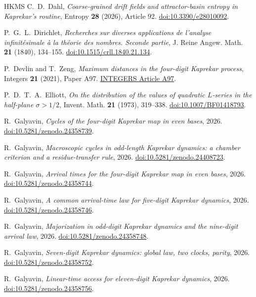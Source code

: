 \documentclass[11pt,reqno]{amsart}
\begin{document}
\begin{thebibliography}{HKMS}
C.~D.~Dahl, \emph{Coarse-grained drift fields and attractor-basin entropy
in Kaprekar's routine}, Entropy \textbf{28} (2026), Article 92.
\href{https://doi.org/10.3390/e28010092}{doi:10.3390/e28010092}.

P.~G.~L.~Dirichlet, \emph{Recherches sur diverses applications de l'analyse infinit\'esimale \`a la th\'eorie des nombres. Seconde partie},
J. Reine Angew. Math. \textbf{21} (1840), 134--155.
\href{https://doi.org/10.1515/crll.1840.21.134}{doi:10.1515/crll.1840.21.134}.

P.~Devlin and T.~Zeng, \emph{Maximum distances in the four-digit
Kaprekar process}, Integers \textbf{21} (2021), Paper A97.
\href{https://math.colgate.edu/~integers/v97/v97.pdf}{INTEGERS Article A97}.

P.~D.~T.~A.~Elliott, \emph{On the distribution of the values of quadratic \(L\)-series in the half-plane \(\sigma>1/2\)},
Invent. Math. \textbf{21} (1973), 319--338.
\href{https://doi.org/10.1007/BF01418793}{doi:10.1007/BF01418793}.

R.~Galyavin, \emph{Cycles of the four-digit Kaprekar map in even bases}, 2026.
\href{https://doi.org/10.5281/zenodo.24358739}{doi:10.5281/zenodo.24358739}.

R.~Galyavin, \emph{Macroscopic cycles in odd-length Kaprekar dynamics: a chamber criterion and a residue-transfer rule}, 2026.
\href{https://doi.org/10.5281/zenodo.24408723}{doi:10.5281/zenodo.24408723}.

R.~Galyavin, \emph{Arrival times for the four-digit Kaprekar map in even bases}, 2026.
\href{https://doi.org/10.5281/zenodo.24358744}{doi:10.5281/zenodo.24358744}.

R.~Galyavin, \emph{A common arrival-time law for five-digit Kaprekar dynamics}, 2026.
\href{https://doi.org/10.5281/zenodo.24358746}{doi:10.5281/zenodo.24358746}.

R.~Galyavin, \emph{Majorization in odd-digit Kaprekar dynamics and the nine-digit arrival law}, 2026.
\href{https://doi.org/10.5281/zenodo.24358748}{doi:10.5281/zenodo.24358748}.

R.~Galyavin, \emph{Seven-digit Kaprekar dynamics: global law, two clocks, parity}, 2026.
\href{https://doi.org/10.5281/zenodo.24358752}{doi:10.5281/zenodo.24358752}.

R.~Galyavin, \emph{Linear-time access for eleven-digit Kaprekar dynamics}, 2026.
\href{https://doi.org/10.5281/zenodo.24358756}{doi:10.5281/zenodo.24358756}.


\end{thebibliography}
\end{document}
